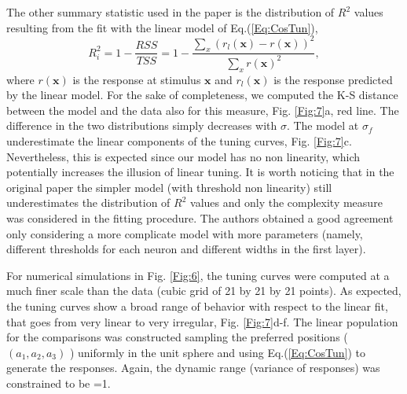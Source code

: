 \documentclass[a4paper]{article}%
\begin{document}
The other summary statistic used in the paper is the distribution of $R^{2}$
values resulting from the fit with the linear model of Eq.(\ref{Eq:CosTun}),
\begin{equation}
R^{2}_{i} = 1- \frac{RSS}{TSS} = 1-\frac{\sum_{x} (r_{l}(\mathbf{x}) -
r(\mathbf{x}))^{2}}{\sum_{x} r(\mathbf{x})^{2}},
\end{equation}
where $r(\mathbf{x})$ is the response at stimulus $\mathbf{x}$ and
$r_{l}(\mathbf{x})$ is the response predicted by the linear model. For the
sake of completeness, we computed the K-S distance between the model and the
data also for this measure, Fig. \ref{Fig:7}a, red line. The difference in the
two distributions simply decreases with $\sigma$. The model at $\sigma_{f}$
underestimate the linear components of the tuning curves, Fig. \ref{Fig:7}c.
Nevertheless, this is expected since our model has no non linearity, which
potentially increases the illusion of linear tuning. It is worth noticing that
in the original paper the simpler model (with threshold non linearity) still
underestimates the distribution of $R^{2}$ values and only the complexity
measure was considered in the fitting procedure. The authors obtained a good
agreement only considering a more complicate model with more parameters
(namely, different thresholds for each neuron and different widths in the
first layer).

For numerical simulations in Fig. \ref{Fig:6}, the tuning curves were computed
at a much finer scale than the data (cubic grid of 21 by 21 by 21 points). As
expected, the tuning curves show a broad range of behavior with respect to the
linear fit, that goes from very linear to very irregular, Fig. \ref{Fig:7}d-f.
The linear population for the comparisons was constructed sampling the
preferred positions ($(a_{1},a_{2},a_{3})$ ) uniformly in the unit sphere and
using Eq.(\ref{Eq:CosTun}) to generate the responses. Again, the dynamic range
(variance of responses) was constrained to be =1.
\end{document}
